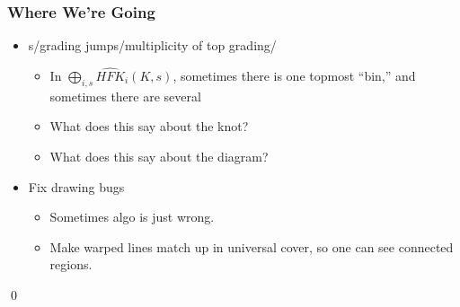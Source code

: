 \documentclass{beamer}
\begin{document}
\begin{frame}
  \frametitle{Where We're Going}
  \begin{itemize}
  \item s/grading jumps/multiplicity of top grading/
    \begin{itemize}
    \item In $\bigoplus_{i, s}\widehat{HFK}_{i}(K, s)$, sometimes there is one topmost ``bin,'' and sometimes there are several
    \item What does this say about the knot?
    \item What does this say about the diagram?
    \end{itemize}
  \item Fix drawing bugs
    \begin{itemize}
    \item Sometimes algo is just wrong.
    \item Make warped lines match up in universal cover, so one can see connected regions.
    \end{itemize}
  \end{itemize}

  \qed
\end{frame}
\end{document}
